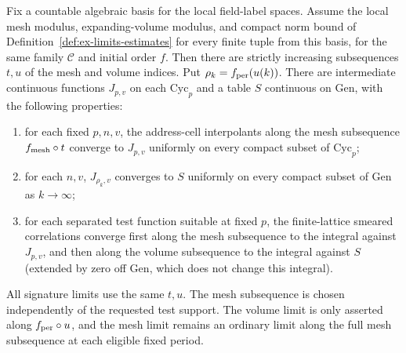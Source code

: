 \begin{proposition}
\label{prop:ex-limits-extraction}
Fix a countable algebraic basis for the local field-label spaces. Assume the
local mesh modulus, expanding-volume modulus, and compact norm bound of
Definition~\ref{def:ex-limits-estimates} for every finite tuple from this
basis, for the same family $\mathcal C$ and initial order $f$. Then there are
strictly increasing subsequences $t,u$ of the mesh and volume indices. Put
$\rho_k=f_{\rm per}(u(k))$. There are intermediate continuous functions $J_{p,v}$ on each $\mathrm{Cyc}_p$
and a table $S$ continuous on $\mathrm{Gen}$, with the following properties:

\begin{enumerate}
\item for each fixed $p,n,v$, the address-cell interpolants along the mesh subsequence
  $f_{\rm mesh}\circ t$ converge to $J_{p,v}$ uniformly on every compact subset
  of $\mathrm{Cyc}_p$;
\item for each $n,v$, $J_{\rho_k,v}$ converges to $S$ uniformly on
  every compact subset of $\mathrm{Gen}$ as $k\to\infty$;
\item for each separated test function suitable at fixed $p$, the finite-lattice
  smeared correlations converge first along the mesh subsequence to the
  integral against $J_{p,v}$, and
  then along the volume subsequence to the integral against $S$ (extended by
  zero off $\mathrm{Gen}$, which does not change this integral).
\end{enumerate}

All signature limits use the same $t,u$. The mesh subsequence is chosen
independently of the requested test support. The volume limit is only asserted
along $f_{\rm per}\circ u$, and the mesh limit remains an ordinary limit along
the full mesh subsequence at each eligible fixed period.
\end{proposition}

